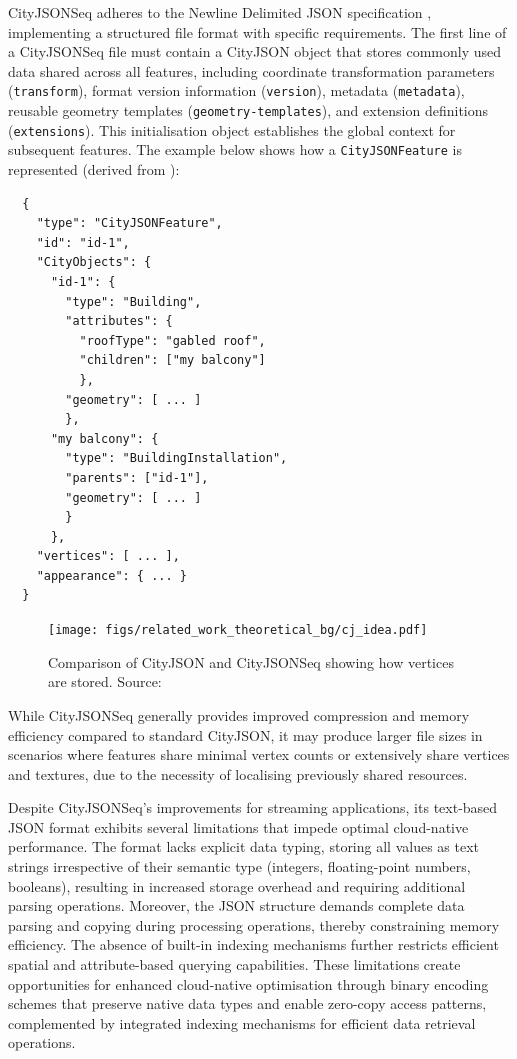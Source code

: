 CityJSONSeq adheres to the Newline Delimited JSON specification \citep{jsonnd}, implementing a structured file format with specific requirements. The first line of a CityJSONSeq file must contain a CityJSON object that stores commonly used data shared across all features, including coordinate transformation parameters (\texttt{transform}), format version information (\texttt{version}), metadata (\texttt{metadata}), reusable geometry templates (\texttt{geometry-templates}), and extension definitions (\texttt{extensions}). This initialisation object establishes the global context for subsequent features.
The example below shows how a \texttt{CityJSONFeature} is represented (derived from \citet{ledoux_2024}):

\begin{lstlisting}
  {
    "type": "CityJSONFeature",
    "id": "id-1",
    "CityObjects": {
      "id-1": {
        "type": "Building",
        "attributes": {
          "roofType": "gabled roof",
          "children": ["my balcony"]
          },
        "geometry": [ ... ]
        },
      "my balcony": {
        "type": "BuildingInstallation",
        "parents": ["id-1"],
        "geometry": [ ... ]
        }
      },
    "vertices": [ ... ],
    "appearance": { ... }
  }
\end{lstlisting}
\begin{figure}[htbp]
  \centering
  \texttt{[image: figs/related\_work\_theoretical\_bg/cj\_idea.pdf]}
  \caption[CityJSONSeq Local Vertices]{Comparison of CityJSON and CityJSONSeq showing how vertices are stored. Source: \citep{ledoux_2024}}
  \label{fig:cityjsonseq_idea}
\end{figure}
While CityJSONSeq generally provides improved compression and memory efficiency compared to standard CityJSON, it may produce larger file sizes in scenarios where features share minimal vertex counts or extensively share vertices and textures, due to the necessity of localising previously shared resources.

Despite CityJSONSeq's improvements for streaming applications, its text-based JSON format exhibits several limitations that impede optimal cloud-native performance. The format lacks explicit data typing, storing all values as text strings irrespective of their semantic type (integers, floating-point numbers, booleans), resulting in increased storage overhead and requiring additional parsing operations. Moreover, the JSON structure demands complete data parsing and copying during processing operations, thereby constraining memory efficiency. The absence of built-in indexing mechanisms further restricts efficient spatial and attribute-based querying capabilities. These limitations create opportunities for enhanced cloud-native optimisation through binary encoding schemes that preserve native data types and enable zero-copy access patterns, complemented by integrated indexing mechanisms for efficient data retrieval operations.


